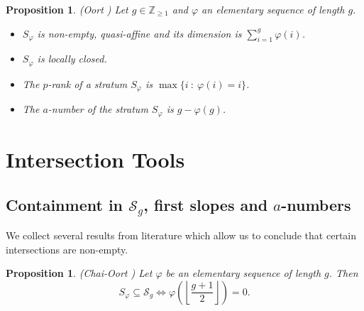 \documentclass[11pt,table]{amsart}
\newcommand{\floor}[1]{\left\lfloor #1 \right\rfloor}
\numberwithin{equation}{section}
\newtheorem{prop}[thm]{Proposition}
\theoremstyle{definition}
\theoremstyle{remark}
\theoremstyle{remark}
\begin{document}
\begin{prop}{(Oort \cite[Theorems 1,2 and p.56]{oort2001stratification})} \label{EOfacts} 
Let $g \in \mathbb{Z}_{\ge 1}$ and $\varphi$ an elementary sequence of length $g$. 
\begin{itemize}
    \item[(i)] $S_{\varphi}$ is non-empty, quasi-affine and its dimension is $\sum_{i=1}^{g} \varphi \left( i \right)$.
    \item[(ii)] $S_{\varphi}$ is locally closed.
    \item[(iii)] The $p$-rank of a stratum $S_{\varphi}$ is $\max \{ i \ : \ \varphi \left( i\right) =i \}$.
    \item[(iv)] The $a$-number of the stratum $S_{\varphi}$ is  $g - \varphi \left( g \right)$.
    \end{itemize}
\end{prop}



\section{Intersection Tools}
\label{intsec}
\subsection{Containment in $\mathcal{S}_g$, first slopes and $a$-numbers}
We collect several results from literature which allow us to conclude that certain intersections are non-empty.
\begin{prop}{({\rm Chai-Oort} \cite[Theorem 4.8]{chai2011monodromy})} \label{contaimentinsslocus} Let $\varphi$ be an elementary sequence of length $g$. Then 
$$ S_{\varphi} \subseteq \mathcal{S}_{g} \iff  \varphi\left(\floor{\frac{g+1}{2}}\right) =0.$$
\end{prop}
\end{document}

